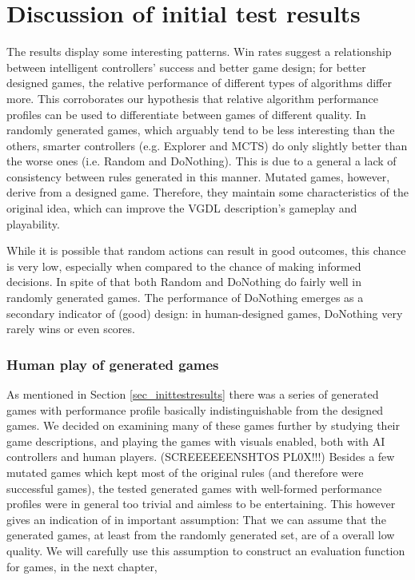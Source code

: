 \documentclass[a4paper,titlepage,final]{report}
\begin{document}
\section{Discussion of initial test results}
\label{sec_task1discussion}
The results display some interesting patterns. Win rates suggest a relationship between intelligent controllers' success and better game design; for better designed games, the relative performance of different types of algorithms differ more. This corroborates our hypothesis that relative algorithm performance profiles can be used to differentiate between games of different quality. In randomly generated games, which arguably tend to be less interesting than the others, smarter controllers (e.g. Explorer and MCTS) do only slightly better than the worse ones (i.e. Random and DoNothing). This is due to a general a lack of consistency between rules generated in this manner. Mutated games, however, derive from a designed game. Therefore, they maintain some characteristics of the original idea, which can improve the VGDL description's gameplay and playability. %

While it is possible that random actions can result in good outcomes, this chance is very low, especially when compared to the chance of making informed decisions. In spite of that both Random and DoNothing do fairly well in randomly generated games. The performance of DoNothing emerges as a secondary indicator of (good) design: in human-designed games, DoNothing very rarely wins or even scores.

\subsubsection*{Human play of generated games}
As mentioned in Section \ref{sec_inittestresults} there was a series of generated games with performance profile basically indistinguishable from the designed games.
We decided on examining many of these games further by studying their game descriptions, and playing the games with visuals enabled, both with AI controllers and human players. (SCREEEEEENSHTOS PL0X!!!)
Besides a few mutated games which kept most of the original rules (and therefore were successful games), the tested generated games with well-formed performance profiles were in general too trivial and aimless to be entertaining.
This however gives an indication of in important assumption: That we can assume that the generated games, at least from the randomly generated set, are of a overall low quality.
We will carefully use this assumption to construct an evaluation function for games, in the next chapter,
\end{document}
